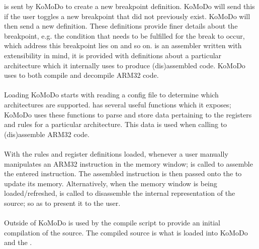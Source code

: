 %
 is sent by KoMoDo to create a new breakpoint definition. KoMoDo will send this if the user toggles a new breakpoint that did not previously exist. KoMoDo will then send a new definition. These definitions provide finer details about the breakpoint, e.g. the condition that needs to be fulfilled for the break to occur, which address this breakpoint lies on and so on.
%
%
%
%
%
%
%
%
 is an assembler written with extensibility in mind, it is provided with definitions about a particular architecture which it internally uses to produce (dis)assembled code. KoMoDo uses  to both compile and decompile ARM32 code.\\\\
%
Loading KoMoDo starts with reading a config file to determine which architectures are supported.  has several useful functions which it exposes; KoMoDo uses these functions to parse and store data pertaining to the registers and rules for a particular architecture. This data is used when calling  to (dis)assemble ARM32 code.\\\\
%
With the rules and register definitions loaded, whenever a user manually manipulates an ARM32 instruction in the memory window;  is called to assemble the entered instruction. The assembled instruction is then passed onto the  to update its memory. Alternatively, when the memory window is being loaded/refreshed,  is called to disassemble the internal representation of the source; so as to present it to the user.\\\\
%
Outside of KoMoDo  is used by the compile script to provide an initial compilation of the source. The compiled source is what is loaded into KoMoDo and the .
